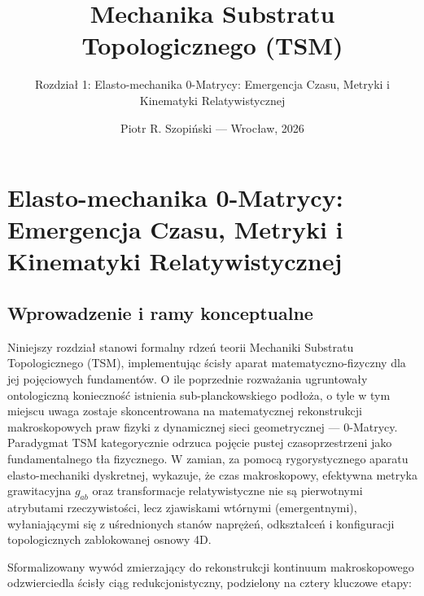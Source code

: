 \documentclass[
  polish,
  letterpaper,
  DIV=11,
  numbers=noendperiod,
  oneside]{scrartcl}
\title{Mechanika Substratu Topologicznego (TSM)}
\subtitle{Rozdział 1: Elasto-mechanika 0-Matrycy: Emergencja Czasu,
Metryki i Kinematyki Relatywistycznej}
\author{Piotr R. Szopiński --- Wrocław, 2026}
\date{}
\renewcommand*\contentsname{Spis treści}
\newcommand\contentsname{Spis treści}
\begin{document}
\maketitle

\renewcommand*\contentsname{Spis treści}
{
\setcounter{tocdepth}{3}
\tableofcontents
}

\section{Elasto-mechanika 0-Matrycy: Emergencja Czasu, Metryki i
Kinematyki Relatywistycznej}\label{sec:rom-tsm}

\subsection{Wprowadzenie i ramy konceptualne}\label{sub-wprowadzenie}

Niniejszy rozdział stanowi formalny rdzeń teorii Mechaniki Substratu
Topologicznego (TSM), implementując ścisły aparat matematyczno-fizyczny
dla jej pojęciowych fundamentów. O ile poprzednie rozważania ugruntowały
ontologiczną konieczność istnienia sub-planckowskiego podłoża, o tyle w
tym miejscu uwaga zostaje skoncentrowana na matematycznej rekonstrukcji
makroskopowych praw fizyki z dynamicznej sieci geometrycznej ---
0-Matrycy. Paradygmat TSM kategorycznie odrzuca pojęcie pustej
czasoprzestrzeni jako fundamentalnego tła fizycznego. W zamian, za
pomocą rygorystycznego aparatu elasto-mechaniki dyskretnej, wykazuje, że
czas makroskopowy, efektywna metryka grawitacyjna \(g_{ab}\) oraz
transformacje relatywistyczne nie są pierwotnymi atrybutami
rzeczywistości, lecz zjawiskami wtórnymi (emergentnymi), wyłaniającymi
się z uśrednionych stanów naprężeń, odkształceń i konfiguracji
topologicznych zablokowanej osnowy 4D.

Sformalizowany wywód zmierzający do rekonstrukcji kontinuum
makroskopowego odzwierciedla ścisły ciąg redukcjonistyczny, podzielony
na cztery kluczowe etapy:
\end{document}
